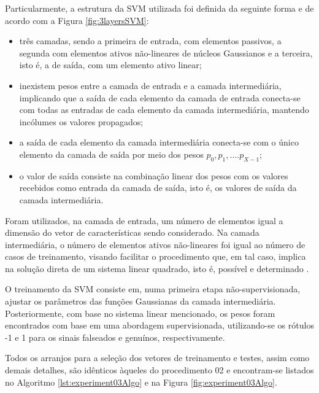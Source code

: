 		\par Particularmente, a estrutura da SVM utilizada foi definida da seguinte forma e de acordo com a Figura \ref{fig:3layersSVM}: 
		\begin{itemize}
			\item três camadas, sendo a primeira de entrada, com elementos passivos, a segunda com elementos ativos não-lineares de núcleos Gaussianos e a terceira, isto é, a de saída, com um elemento ativo linear; 
			
			\item inexistem pesos entre a camada de entrada e a camada intermediária, implicando que a saída de cada elemento da camada de entrada conecta-se com todas as entradas de cada elemento da camada intermediária, mantendo incólumes os valores propagados;

			\item a saída de cada elemento da camada intermediária conecta-se com o único elemento da camada de saída por meio dos pesos $p_0, p_1, .... p_{X-1}$;

			\item o valor de saída consiste na combinação linear dos pesos com os valores recebidos como entrada da camada de saída, isto é, os valores de saída da camada intermediária.
		\end{itemize}

		

		\par Foram utilizados, na camada de entrada, um número de elementos igual a dimensão do vetor de características sendo considerado. Na camada intermediária, o número de elementos ativos não-lineares foi igual ao número de casos de treinamento, visando facilitar o procedimento que, em tal caso, implica na solução direta de um sistema linear quadrado, isto é, possível e determinado \cite{poole2014linear}.\\
		
		\par O treinamento da SVM consiste em, numa primeira etapa não-supervisionada, ajustar os parâmetros das funções Gaussianas da camada intermediária. Posteriormente, com base no sistema linear mencionado, os pesos foram encontrados com base em uma abordagem supervisionada, utilizando-se os rótulos -1 e 1 para os sinais falseados e genuínos, respectivamente.\\
		
		\par Todos os arranjos para a seleção dos vetores de treinamento e testes, assim como demais detalhes,   são idênticos àqueles do procedimento 02 e encontram-se listados no Algoritmo \ref{lst:experiment03Algo} e na Figura \ref{fig:experiment03Algo}.\\
		
